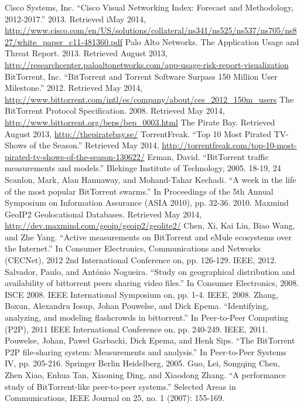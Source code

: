 \documentclass[conference]{IEEEtran}
\begin{document}
\begin{thebibliography}{1}
Cisco Systems, Inc. ``Cisco Visual Networking Index: Forecast and Methodology, 2012-2017.'' 2013. Retrieved iMay 2014, \url{http://www.cisco.com/en/US/solutions/collateral/ns341/ns525/ns537/ns705/ns827/white_paper_c11-481360.pdf}
Palo Alto Networks. The Application Usage and Threat Report. 2013. Retrieved August 2013, \url{http://researchcenter.paloaltonetworks.com/app-usage-risk-report-visualization}
BitTorrent, Inc. ``BitTorrent and Torrent Software Surpass 150 Million User Milestone.'' 2012. Retrieved May 2014, \url{http://www.bittorrent.com/intl/es/company/about/ces_2012_150m_users}
The BitTorrent Protocol Specification. 2008. Retrieved May 2014,\\ \url{http://www.bittorrent.org/beps/bep_0003.html}
The Pirate Bay. Retrieved August 2013, \url{http://thepiratebay.se/}
TorrentFreak. ``Top 10 Most Pirated TV-Shows of the Season.'' Retrieved May 2014, \url{http://torrentfreak.com/top-10-most-pirated-tv-shows-of-the-season-130622/}
Erman, David. ``BitTorrent traffic measurements and models.'' Blekinge Institute of Technology, 2005. 18-19, 24
Scanlon, Mark, Alan Hannaway, and Mohand-Tahar Kechadi. ``A week in the life of the most popular BitTorrent swarms.'' In Proceedings of the 5th Annual Symposium on Information Assurance (ASIA 2010), pp. 32-36. 2010.
Maxmind GeoIP2 Geolocational Databases. Retrieved May 2014,\\ \url{http://dev.maxmind.com/geoip/geoip2/geolite2/}
Chen, Xi, Kai Lin, Biao Wang, and Zhe Yang. ``Active measurements on BitTorrent and eMule ecosystems over the Internet.'' In Consumer Electronics, Communications and Networks (CECNet), 2012 2nd International Conference on, pp. 126-129. IEEE, 2012.
Salvador, Paulo, and António Nogueira. ``Study on geographical distribution and availability of bittorrent peers sharing video files.'' In Consumer Electronics, 2008. ISCE 2008. IEEE International Symposium on, pp. 1-4. IEEE, 2008.
Zhang, Boxun, Alexandru Iosup, Johan Pouwelse, and Dick Epema. ``Identifying, analyzing, and modeling flashcrowds in bittorrent.'' In Peer-to-Peer Computing (P2P), 2011 IEEE International Conference on, pp. 240-249. IEEE, 2011.
Pouwelse, Johan, Paweł Garbacki, Dick Epema, and Henk Sips. ``The BitTorrent P2P file-sharing system: Measurements and analysis.'' In Peer-to-Peer Systems IV, pp. 205-216. Springer Berlin Heidelberg, 2005.
Guo, Lei, Songqing Chen, Zhen Xiao, Enhua Tan, Xiaoning Ding, and Xiaodong Zhang. ``A performance study of BitTorrent-like peer-to-peer systems.'' Selected Areas in Communications, IEEE Journal on 25, no. 1 (2007): 155-169.
\end{thebibliography}
\end{document}

